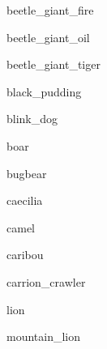 \documentclass[letterpaper,serif]{module}
\begin{document}
\begin{newmonster}{beetle_giant_fire}\end{newmonster}

\begin{newmonster}{beetle_giant_oil}\end{newmonster}

\begin{newmonster}{beetle_giant_tiger}\end{newmonster}

\begin{newmonster}{black_pudding}\end{newmonster}

\begin{newmonster}{blink_dog}\end{newmonster}

\begin{newmonster}{boar}\end{newmonster}

\begin{newmonster}{bugbear}\end{newmonster}

\begin{newmonster}{caecilia}\end{newmonster}

\begin{newmonster}{camel}\end{newmonster}

\begin{newmonster}{caribou}\end{newmonster}

\begin{newmonster}{carrion_crawler}\end{newmonster}

\begin{newmonster}{lion}\end{newmonster}

\begin{newmonster}{mountain_lion}\end{newmonster}
\end{document}
